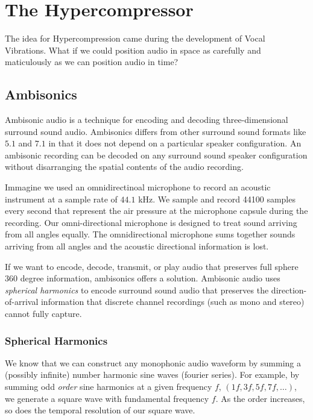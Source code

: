 \chapter{The Hypercompressor}
\label{ch:hypercompressor}

The idea for Hypercompression came during the development of Vocal
Vibrations.\cite{Holbrow2014} What if we could position audio in space
as carefully and maticulously as we can position audio in time?

\section{Ambisonics}
\label{sec:ambisonics}
Ambisonic audio is a technique for encoding and decoding three-dimensional
surround sound audio.\cite{Gerzon1985} Ambisonics differs from other
surround sound formats like $5.1$ and $7.1$ in that it does not depend
on a particular speaker configuration. An ambisonic recording can be
decoded on any surround sound speaker configuration without
disarranging the spatial contents of the audio recording.

Immagine we used an omnidirectinoal microphone to record an acoustic
instrument at a sample rate of $44.1$ kHz. We sample and record 44100
samples every second that represent the air pressure at the microphone
capsule during the recording. Our omni-directional microphone is
designed to treat sound arriving from all angles equally. The
omnidirectional microphone sums together sounds arriving from all
angles and the acoustic directional information is lost.

If we want to encode, decode, transmit, or play audio that preserves
full sphere 360 degree information, ambisonics offers a solution.
Ambisonic audio uses \textit{spherical harmonics} to encode surround
sound audio that preserves the direction-of-arrival information that
discrete channel recordings (such as mono and stereo) cannot fully
capture.

\subsection{Spherical Harmonics}
\label{sec:spherical-harmonics}
We know that we can construct any monophonic audio waveform by summing
a (possibly infinite) number harmonic sine waves (fourier
series).
For example, by summing odd \textit{order} sine harmonics at a given
frequency $f$, $(1f, 3f, 5f, 7f, \ldots )$, we generate a square wave with
fundamental frequency $f$. As the order increases, so does the
temporal resolution of our square wave.

